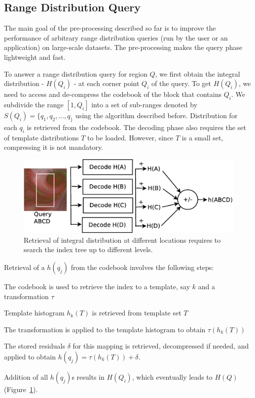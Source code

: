 \subsection{Range Distribution Query}
\label{subsec:query}
The main goal of the pre-processing described so far is to improve the performance of arbitrary range distribution queries (run by the user or an application) on large-scale datasets. The pre-processing makes the query phase lightweight and fast. 

To answer a range distribution query for region $Q$, we first obtain the integral distribution - $H(Q_i)$ - at each corner point $Q_i$ of the query. To get $H(Q_i)$, we need to access and de-compress the codebook of the block that contains $Q_i$. We subdivide the range $[1,Q_i]$ into a set of sub-ranges denoted by $S(Q_i)= \{q_1,q_2, . . . ,q_\}$ using the algorithm described before. Distribution for each $q_i$ is retrieved from the codebook. The decoding phase also requires the set of template distributions $T$ to be loaded. However, since $T$ is a small set, compressing it is not mandatory.
\begin{figure}[!htb]
\centering
	\includegraphics[width = 0.84\linewidth, keepaspectratio = true]{images/eps/decoding.eps}
	\caption{Retrieval of integral distribution at different locations requires to search the index tree up to different levels.}	
	\label{fig:retrieval}
\end{figure}

Retrieval of a $h(q_j)$ from the codebook involves the following steps:
\begin{packed_enumerate}
\item The codebook is used to retrieve the index to a template, say $k$ and a transformation $\tau$
\item Template histogram $h_k(T)$ is retrieved from template set $T$
\item The transformation is applied to the template histogram to obtain $\tau(h_k(T))$
\item The stored residuals $\delta$ for this mapping is retrieved, decompressed if needed, and applied to obtain $h(q_j) = \tau(h_k(T))+\delta$. 
\end{packed_enumerate}
Addition of all $h(q_j)$s results in $H(Q_i)$, which eventually leads to $H(Q)$ (Figure~\ref{fig:retrieval}). 

